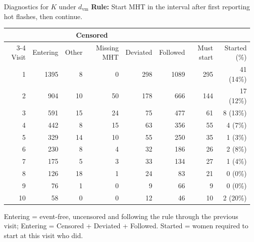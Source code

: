 \documentclass[11pt, xcolor={dvipsnames}, usepdftitle=false]{beamer}
\begin{document}
\begin{frame}{Diagnostics for $K$ under $d_\text{vm}$}
\centering
{\small \textbf{Rule:} Start MHT in the interval after first reporting hot flashes, then continue.}\par\vspace{6pt}
{\scriptsize
\begin{tabular}{r r r r r r r r}
\toprule
 & & \multicolumn{2}{c}{Censored} & & & & \\
\cmidrule(lr){3-4}
Visit & Entering & Other & Missing MHT & Deviated & Followed & Must start & Started (\%) \\
\midrule
1 & 1395 & 8 & 0 & 298 & 1089 & 295 & 41 (14\%) \\
2 & 904 & 10 & 50 & 178 & 666 & 144 & 17 (12\%) \\
3 & 591 & 15 & 24 & 75 & 477 & 61 & 8 (13\%) \\
4 & 442 & 8 & 15 & 63 & 356 & 55 & 4 (7\%) \\
5 & 329 & 14 & 10 & 55 & 250 & 35 & 1 (3\%) \\
6 & 230 & 8 & 4 & 32 & 186 & 26 & 2 (8\%) \\
7 & 175 & 5 & 3 & 33 & 134 & 27 & 1 (4\%) \\
8 & 126 & 18 & 1 & 24 & 83 & 21 & 0 (0\%) \\
9 & 76 & 1 & 0 & 9 & 66 & 9 & 0 (0\%) \\
10 & 58 & 0 & 0 & 12 & 46 & 10 & 2 (20\%) \\
\bottomrule
\end{tabular}}
\par\vspace{6pt}
{\tiny Entering = event-free, uncensored and following the rule through the previous visit; Entering = Censored + Deviated + Followed. Started = women required to start at this visit who did.}
\end{frame}
\end{document}
